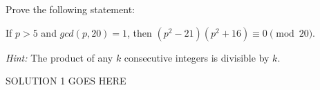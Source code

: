 \documentclass[11pt]{article}
\begin{document}
	

\medskip


\lineacross


\begin{problem} %
	\vspace{0.05in}
    \noindent  Prove the following statement: 
    
    
    \noindent 
    If $p > 5$ and $gcd(p, 20) = 1$,
    then $(p^2 -21)(p^2 +16)\equiv 0 \pmod{20}$.
    
    \vspace{0.1in}
    \noindent  
    \emph{Hint:} 
    The product of any $k$ consecutive integers is divisible by $k$.

\end{problem}


\begin{solution} %
	SOLUTION 1 GOES HERE
\end{solution}

\end{document}
